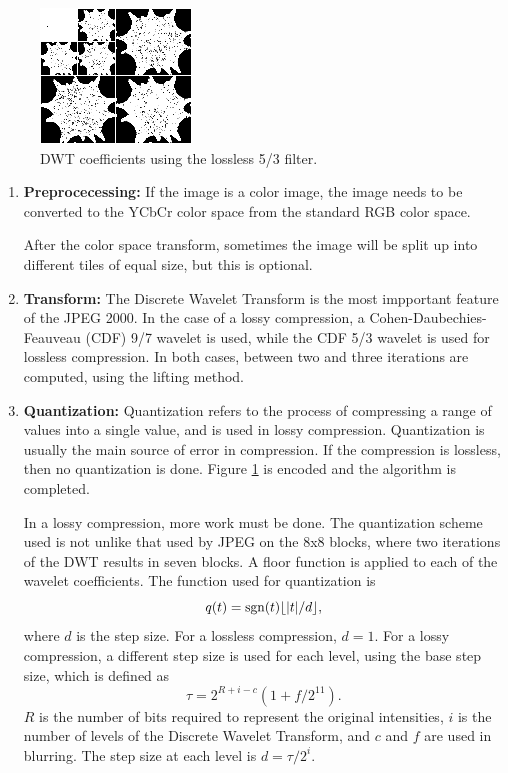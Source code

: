 \documentclass[titlepage,12pt]{article}
\DeclarePairedDelimiter\floor{\lfloor}{\rfloor}
\DeclareMathOperator{\sgn}{sgn}
\begin{document}
\begin{figure}[h]
	\centering
	\includegraphics[scale=0.6]{resources/losslessbaby.png}
	\caption{DWT coefficients using the lossless 5/3 filter.}
	\label{fig:losslessbaby}
\end{figure}

\begin{enumerate}
	
	\item\textbf{Preprocecessing:}
	If the image is a color image, the image needs to be converted to the YCbCr color space\cite{colorspace}
	from the standard RGB color space.

	After the color space transform, sometimes the image will be split up into different tiles of equal size,
	but this is optional.
	
	\item\textbf{Transform:}
	The Discrete Wavelet Transform is the most impportant feature of the JPEG 2000.
	In the case of a lossy compression, a Cohen-Daubechies-Feauveau (CDF) 9/7 wavelet is used,
	while the CDF 5/3 wavelet is used for lossless compression.
	In both cases, between two and three iterations are computed, using the lifting method.
	
	\item\textbf{Quantization:}
	Quantization refers to the process of compressing a range of values into a single value,
	and is used in lossy compression.
	Quantization is usually the main source of error in compression.\cite{clifford}
	If the compression is lossless, then no quantization is done.
	Figure \ref{fig:losslessbaby} is encoded and the algorithm is completed.
	
	In a lossy compression, more work must be done.
	The quantization scheme used is not unlike that used by JPEG on the 8x8 blocks,
	where two iterations of the DWT results in seven blocks.
	A floor function is applied to each of the wavelet coefficients.
	The function used for quantization is
	\begin{equation}
		q(t) = \sgn(t)\floor*{|t|/d},
	\end{equation}
	where $d$ is the step size.\cite{whydomath}
	For a lossless compression, $d=1$.
	For a lossy compression, a different step size is used for each level,
	using the base step size, which is defined as
	\begin{equation}
		\tau = 2^{R+i-c}(1+f/2^{11}).
	\end{equation}
	$R$ is the number of bits required to represent the original intensities,
	$i$ is the number of levels of the Discrete Wavelet Transform,
	and $c$ and $f$ are used in blurring.
	The step size at each level is $d=\tau/2^i$.
	

\end{enumerate}
\end{document}
